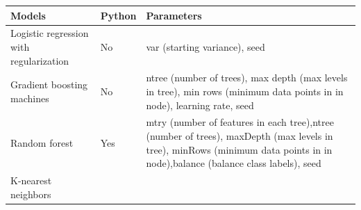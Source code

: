 \documentclass[]{article}
\begin{document}
\begin{longtable}[]{@{}lll@{}}
\toprule
\begin{minipage}[b]{0.35\columnwidth}\raggedright\strut
Models\strut
\end{minipage} & \begin{minipage}[b]{0.08\columnwidth}\raggedright\strut
Python\strut
\end{minipage} & \begin{minipage}[b]{0.48\columnwidth}\raggedright\strut
Parameters\strut
\end{minipage}\tabularnewline
\midrule
\endhead
\begin{minipage}[t]{0.35\columnwidth}\raggedright\strut
Logistic regression with regularization\strut
\end{minipage} & \begin{minipage}[t]{0.08\columnwidth}\raggedright\strut
No\strut
\end{minipage} & \begin{minipage}[t]{0.48\columnwidth}\raggedright\strut
var (starting variance), seed\strut
\end{minipage}\tabularnewline
\begin{minipage}[t]{0.35\columnwidth}\raggedright\strut
Gradient boosting machines\strut
\end{minipage} & \begin{minipage}[t]{0.08\columnwidth}\raggedright\strut
No\strut
\end{minipage} & \begin{minipage}[t]{0.48\columnwidth}\raggedright\strut
ntree (number of trees), max depth (max levels in tree), min rows
(minimum data points in in node), learning rate, seed\strut
\end{minipage}\tabularnewline
\begin{minipage}[t]{0.35\columnwidth}\raggedright\strut
Random forest\strut
\end{minipage} & \begin{minipage}[t]{0.08\columnwidth}\raggedright\strut
Yes\strut
\end{minipage} & \begin{minipage}[t]{0.48\columnwidth}\raggedright\strut
mtry (number of features in each tree),ntree (number of trees), maxDepth
(max levels in tree), minRows (minimum data points in in node),balance
(balance class labels), seed\strut
\end{minipage}\tabularnewline
\begin{minipage}[t]{0.35\columnwidth}\raggedright\strut
K-nearest neighbors\strut

\end{minipage}
\end{longtable}
\end{document}
